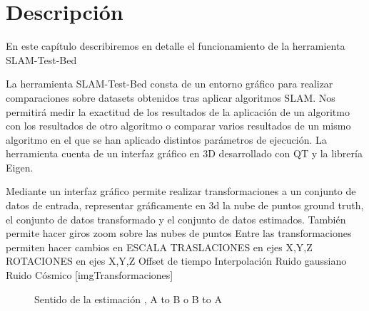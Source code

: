 \chapter{Descripción} \label{cap:Descripcion}
En este capítulo describiremos en detalle el funcionamiento de la herramienta SLAM-Test-Bed

La herramienta SLAM-Test-Bed consta de un entorno gráfico para realizar comparaciones sobre datasets obtenidos tras aplicar algoritmos SLAM. 
Nos permitirá medir la exactitud de los resultados de la aplicación de un algoritmo con los resultados de otro algoritmo o comparar varios resultados de un mismo algoritmo en el que se han aplicado distintos parámetros de ejecución.
La herramienta cuenta de un interfaz gráfico en 3D desarrollado con QT y la librería Eigen.


Mediante un interfaz gráfico permite realizar transformaciones a un conjunto de datos de entrada, representar gráficamente en 3d la nube de puntos ground truth, el conjunto de datos transformado y el conjunto de datos estimados.
También permite hacer giros zoom sobre las nubes de puntos
Entre las transformaciones permiten hacer cambios en 
ESCALA
TRASLACIONES en ejes X,Y,Z
ROTACIONES en ejes X,Y,Z
Offset de tiempo
Interpolación
Ruido gaussiano
Ruido Cósmico
[imgTransformaciones]
\begin{figure}[H]
\begin{center}
\hspace{0.5cm}
\end{center}
\caption{Sentido de la estimación , A to B o B to A }
\end{figure}

